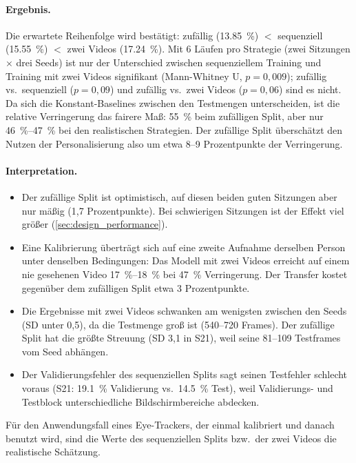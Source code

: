 \documentclass[
  11pt,
  a4paper,
  oneside,
  DIV=12,
  BCOR=8mm,
  parskip=half,
  headings=normal,
  bibliography=totoc,
  listof=totoc
]{scrreprt}
\begin{document}
\paragraph{Ergebnis.} Die erwartete Reihenfolge wird bestätigt: zufällig
(\SI{13,85}{\percent}) $<$ sequenziell (\SI{15,55}{\percent}) $<$ zwei Videos
(\SI{17,24}{\percent}). Mit 6 Läufen pro Strategie (zwei Sitzungen $\times$
drei Seeds) ist nur der Unterschied zwischen sequenziellem Training und
Training mit zwei Videos signifikant (Mann-Whitney U, $p=0,009$); zufällig
vs.\ sequenziell ($p=0,09$) und zufällig vs.\ zwei Videos ($p=0,06$) sind es
nicht. Da sich die Konstant-Baselines zwischen den Testmengen unterscheiden,
ist die relative Verringerung das fairere Maß: \SI{55}{\percent} beim
zufälligen Split, aber nur \SI{46}{\percent}--\SI{47}{\percent} bei den
realistischen Strategien. Der zufällige Split überschätzt den Nutzen der
Personalisierung also um etwa 8--9 Prozentpunkte der Verringerung.

\paragraph{Interpretation.}
\begin{itemize}[nosep]
  \item Der zufällige Split ist optimistisch, auf diesen beiden guten
        Sitzungen aber nur mäßig (1,7 Prozentpunkte). Bei schwierigen
        Sitzungen ist der Effekt viel größer (\cref{sec:design_performance}).
  \item Eine Kalibrierung überträgt sich auf eine zweite Aufnahme derselben
        Person unter denselben Bedingungen: Das Modell mit zwei Videos
        erreicht auf einem nie gesehenen Video
        \SI{17}{\percent}--\SI{18}{\percent} bei \SI{47}{\percent}
        Verringerung. Der Transfer kostet gegenüber dem zufälligen Split etwa
        3 Prozentpunkte.
  \item Die Ergebnisse mit zwei Videos schwanken am wenigsten zwischen den
        Seeds (SD unter 0,5), da die Testmenge groß ist (540--720 Frames).
        Der zufällige Split hat die größte Streuung (SD 3,1 in S21), weil
        seine 81--109 Testframes vom Seed abhängen.
  \item Der Validierungsfehler des sequenziellen Splits sagt seinen
        Testfehler schlecht voraus (S21: \SI{19,1}{\percent} Validierung vs.\
        \SI{14,5}{\percent} Test), weil Validierungs- und Testblock
        unterschiedliche Bildschirmbereiche abdecken.
\end{itemize}
Für den Anwendungsfall eines Eye-Trackers, der einmal kalibriert und danach
benutzt wird, sind die Werte des sequenziellen Splits bzw.\ der zwei Videos
die realistische Schätzung.
\end{document}
